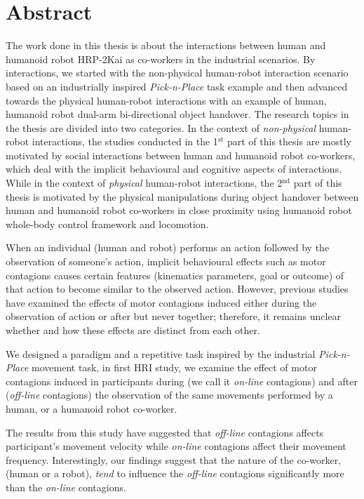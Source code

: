 {\color{blue}\chapter*{Abstract}}
\thispagestyle{empty}


The work done in this thesis is about the interactions between human and humanoid robot HRP-2Kai as co-workers in the industrial scenarios. By interactions, we started with the non-physical human-robot interaction scenario based on an industrially inspired \textit{Pick-n-Place} task example and then advanced towards the physical human-robot interactions with an example of human, humanoid robot dual-arm bi-directional object handover. The research topics in the thesis are divided into two categories. In the context of \textit{non-physical} human-robot interactions, the studies conducted in the 1$^\text{st}$ part of this thesis are mostly motivated by social interactions between human and humanoid robot co-workers, which deal with the implicit behavioural and cognitive aspects of interactions. While in the context of \textit{physical} human-robot interactions, the 2$^\text{nd}$ part of this thesis is motivated by the physical manipulations during object handover between human and humanoid robot co-workers in close proximity using humanoid robot whole-body control framework and locomotion.


When an individual (human and robot) performs an action followed by the observation of someone's action, implicit behavioural effects such as motor contagions causes certain features (kinematics parameters, goal or outcome) of that action to become similar to the observed action. However, previous studies have examined the effects of motor contagions induced either during the observation of action or after but never together; therefore, it remains unclear whether and how these effects are distinct from each other.

We designed a paradigm and a repetitive task inspired by the industrial \textit{Pick-n-Place} movement task, in first HRI study, we examine the effect of motor contagions induced in participants during (we call it \textit{on-line} contagions) and after (\textit{off-line} contagions) the observation of the same movements performed by a human, or a humanoid robot co-worker.

The results from this study have suggested that \textit{off-line} contagions affects participant's movement velocity while \textit{on-line} contagions affect their movement frequency. Interestingly, our findings suggest that the nature of the co-worker, (human or a robot), \textit{tend} to influence the \textit{off-line} contagions significantly more than the \textit{on-line} contagions.


